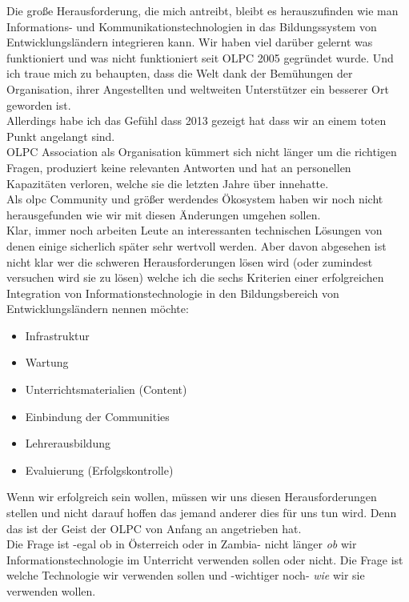 \documentclass[10pt,a4paper,ngerman,twoside]{article} %
\begin{document}
\begin{multicols}{3}
Die große Herausforderung, die mich antreibt, bleibt es herauszufinden wie man Informations- und Kommunikationstechnologien in das Bildungssystem von Entwicklungsländern integrieren kann. Wir haben viel darüber gelernt was funktioniert und was nicht funktioniert seit OLPC 2005 gegründet wurde. Und ich traue mich zu behaupten, dass die Welt dank der Bemühungen der Organisation, ihrer Angestellten und weltweiten Unterstützer ein besserer Ort geworden ist. \\

Allerdings habe ich das Gefühl dass 2013 gezeigt hat dass wir an einem toten Punkt angelangt sind. \\

OLPC Association als Organisation kümmert sich nicht länger um die richtigen Fragen, produziert keine relevanten Antworten und hat an personellen Kapazitäten verloren, welche sie die letzten Jahre über innehatte. \\

Als olpc Community und größer werdendes Ökosystem haben wir noch nicht herausgefunden wie wir mit diesen Änderungen umgehen sollen. \\

Klar, immer noch arbeiten Leute an interessanten technischen Lösungen von denen einige sicherlich später sehr wertvoll werden. Aber davon abgesehen ist nicht klar wer die schweren Herausforderungen lösen wird (oder zumindest versuchen wird sie zu lösen) welche ich die sechs Kriterien einer erfolgreichen Integration von Informationstechnologie in den Bildungsbereich von Entwicklungsländern nennen möchte:

\begin{itemize}
\item Infrastruktur
\item Wartung
\item Unterrichtsmaterialien (Content)
\item Einbindung der Communities
\item Lehrerausbildung
\item Evaluierung (Erfolgskontrolle)
\end{itemize}

Wenn wir erfolgreich sein wollen, müssen wir uns diesen Herausforderungen stellen und nicht darauf hoffen das jemand anderer dies für uns tun wird. Denn das ist der Geist der OLPC von Anfang an angetrieben hat. \\

Die Frage ist -egal ob in Österreich oder in Zambia- nicht länger \textit{ob} wir Informationstechnologie im Unterricht verwenden sollen oder nicht. Die Frage ist welche Technologie wir verwenden sollen und -wichtiger noch- \textit{wie} wir sie verwenden wollen. \\


\end{multicols}
\end{document}
